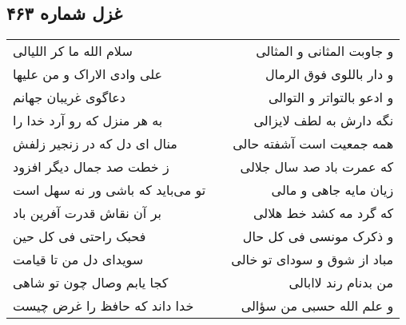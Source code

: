 \begin{center}
\section*{غزل شماره ۴۶۳}
\label{sec:sh463}
\begin{longtable}{l p{0.5cm} r}
سلام الله ما کر اللیالی
&&
و جاوبت المثانی و المثالی
\\
علی وادی الاراک و من علیها
&&
و دار باللوی فوق الرمال
\\
دعاگوی غریبان جهانم
&&
و ادعو بالتواتر و التوالی
\\
به هر منزل که رو آرد خدا را
&&
نگه دارش به لطف لایزالی
\\
منال ای دل که در زنجیر زلفش
&&
همه جمعیت است آشفته حالی
\\
ز خطت صد جمال دیگر افزود
&&
که عمرت باد صد سال جلالی
\\
تو می‌باید که باشی ور نه سهل است
&&
زیان مایه جاهی و مالی
\\
بر آن نقاش قدرت آفرین باد
&&
که گرد مه کشد خط هلالی
\\
فحبک راحتی فی کل حین
&&
و ذکرک مونسی فی کل حال
\\
سویدای دل من تا قیامت
&&
مباد از شوق و سودای تو خالی
\\
کجا یابم وصال چون تو شاهی
&&
من بدنام رند لاابالی
\\
خدا داند که حافظ را غرض چیست
&&
و علم الله حسبی من سؤالی
\\
\end{longtable}
\end{center}
